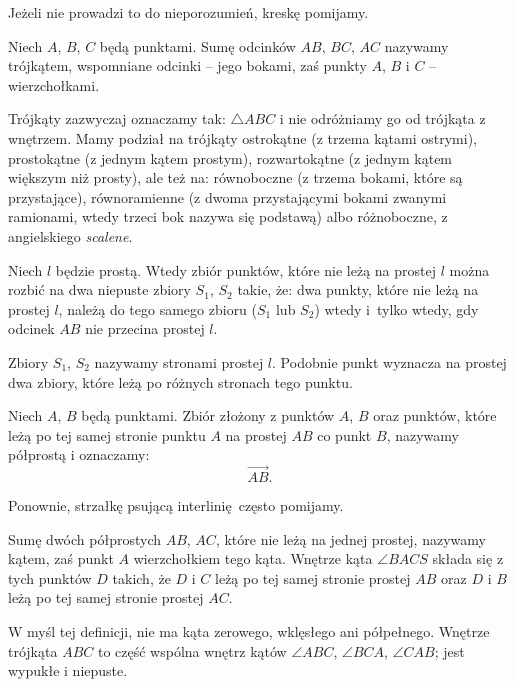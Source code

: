Jeżeli nie prowadzi to do nieporozumień, kreskę pomijamy.

\begin{definition}[trójkąt]
    Niech $A$, $B$, $C$ będą punktami.
    Sumę odcinków $AB$, $BC$, $AC$ nazywamy trójkątem, wspomniane odcinki -- jego bokami, zaś punkty $A$, $B$ i $C$ -- wierzchołkami.
%
\end{definition} %

Trójkąty zazwyczaj oznaczamy tak: $\triangle ABC$ i nie odróżniamy go od trójkąta z wnętrzem.
Mamy podział na trójkąty ostrokątne (z trzema kątami ostrymi), prostokątne (z jednym kątem prostym), rozwartokątne (z jednym kątem większym niż prosty), ale też na: równoboczne (z trzema bokami, które są przystające), równoramienne (z dwoma przystającymi bokami zwanymi ramionami, wtedy trzeci bok nazywa się podstawą) albo różnoboczne, z angielskiego \emph{scalene}.

\begin{proposition}
    Niech $l$ będzie prostą.
    Wtedy zbiór punktów, które nie leżą na prostej $l$ można rozbić na dwa niepuste zbiory $S_1$, $S_2$ takie, że: dwa punkty, które nie leżą na prostej $l$, należą do tego samego zbioru ($S_1$ lub $S_2$) wtedy i~tylko wtedy, gdy odcinek $AB$ nie przecina prostej $l$.
\end{proposition} %

Zbiory $S_1$, $S_2$ nazywamy stronami prostej $l$.
%
Podobnie punkt wyznacza na prostej dwa zbiory, które leżą po różnych stronach tego punktu.

\begin{definition}[półprosta]
    Niech $A$, $B$ będą punktami.
    Zbiór złożony z punktów $A$, $B$ oraz punktów, które leżą po tej samej stronie punktu $A$ na prostej $AB$ co punkt $B$, nazywamy półprostą i oznaczamy:
%
    \begin{equation}
        \overrightarrow{AB}.
    \end{equation}
\end{definition} %

Ponownie, strzałkę psującą interlinię często pomijamy.

\begin{definition}[kąt]
    Sumę dwóch półprostych $AB$, $AC$, które nie leżą na jednej prostej, nazywamy kątem, zaś punkt $A$ wierzchołkiem tego kąta.
    Wnętrze kąta $\angle BACS$ składa się z tych punktów $D$ takich, że $D$ i $C$ leżą po tej samej stronie prostej $AB$ oraz $D$ i $B$ leżą po tej samej stronie prostej $AC$. 
\end{definition} %

W myśl tej definicji, nie ma kąta zerowego, wklęsłego ani półpełnego.
%
%
%
Wnętrze trójkąta $ABC$ to część wspólna wnętrz kątów $\angle ABC$, $\angle BCA$, $\angle CAB$; jest wypukłe i niepuste.

%